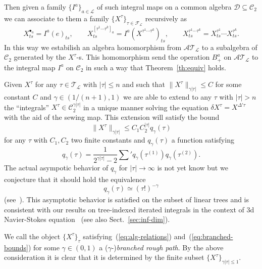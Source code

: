 \documentclass[a4paper]{article}
\newcommand{\1}{{\bf 1}}
\newcommand{\der}{\delta}
\newcommand{\FF}{\mathcal{F}}
\newcommand{\CC}{\mathcal{C}}
\newcommand{\DD}{\mathcal{D}}
\newcommand{\LL}{\mathcal{L}}
\newcommand{\TT}{\mathcal{T}}
\newcommand{\cA}{\mathcal{A}}
\newcommand{\troot}{\bullet}
\newcommand{\CC}{\mathcal{C}}
\newcommand{\der}{\delta}
\begin{document}
Then
given a family $\{I^a\}_{a\in\LL}$ of such integral maps on a common
algebra $\DD\subseteq \CC_{2}$ we can associate to them a family $\{X^{\tau}\}_{\tau\in\FF_\LL}$ recursively as
$$
X^{\troot_a}_{ts} = I^a(e)_{ts}, \qquad X^{[\tau^1 \cdots \tau^k]_a}_{ts} = I^a(X^{\tau^1 \cdots \tau^k})_{ts}, \qquad X^{\tau^1\cdots \tau^k}_{ts}= X^{\tau^1}_{ts} \cdots  X^{\tau^k}_{ts}.
$$   
In this way we estabilish an algebra homomorphism from $\cA\TT_\LL$ to
a subalgebra of $\CC_2$ generated by the $X^\tau$-s. This homomorphism
send the operation $B_+^a$ on $\cA\TT_\LL$ to the integral map $I^a$
on $\CC_2$ in such a way that Theorem~\ref{th:equiv} holds.

Given $X^\tau$ for any $\tau\in\TT_\LL$ with $|\tau| \le n$ and such
that $\|X^\tau\|_{\gamma |\tau|} \le C$ for some constant $C$ and
$\gamma \in (1/(n+1),1)$ we are able to extend to any $\tau$ with
$|\tau| > n$ the ``integrals'' $X^\tau
\in \CC^{\gamma |\tau|}_2$ in a unique manner solving  the
equation $\der X^{\tau} = X^{\Delta ' \tau}$ with the aid of the
sewing map. This extension will satisfy the bound
\begin{equation}
  \label{eq:branched-bounds}
\|X^\tau\|_{\gamma |\tau|} \le C_1 C_2^{|\tau|} q_\gamma(\tau)  
\end{equation}
for any $\tau$ with $C_1,C_2$ two finite constants and
$q_\gamma(\tau)$ a function satisfying
$$
q_\gamma(\tau) = \frac{1}{2^{\gamma |\tau|}-2} \sum'
q_\gamma(\tau^{(1)}) q_\gamma(\tau^{(2)}).
$$
The actual asympotic behavior of $q_\gamma$ for $|\tau| \to \infty$ is
not yet know but we conjecture that it should hold the equivalence
\begin{equation}
  \label{eq:q-conj}
  q_{\gamma}(\tau) \simeq (\tau !)^{-\gamma}
\end{equation}
(see~\cite{ramif}).
This asymptotic behavior is satisfied on the subset
of linear trees and is consistent with our
results on  tree-indexed iterated integrals in the context of 3d
Navier-Stokes equation~\cite{MR2227041} (see also Sect.~\ref{sec:inf-dim}).

We call the object  $\{X^{\tau}\}_{\tau}$ satisfying~(\ref{eq:alg-relations})
and~(\ref{eq:branched-bounds}) for some $\gamma \in (0,1)$ a
($\gamma$-)\emph{branched rough path}. By the above consideration it
is clear that it is determined by the finite subset
$\{X^{\tau}\}_{\gamma |\tau| \le 1}$.
\end{document}
